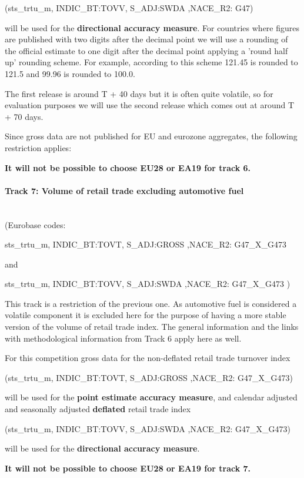 \documentclass[12pt]{article}
\begin{document}
(sts\_trtu\_m, INDIC\_BT:TOVV, S\_ADJ:SWDA ,NACE\_R2: G47)

 will be used for the \textbf{directional accuracy measure}. For countries where figures are published with two digits after the decimal point we will use a rounding of the official estimate to one digit after the decimal point applying a 'round half up' rounding scheme. For example, according to this scheme 121.45 is rounded to 121.5 and 99.96 is rounded to 100.0.

The first release is around T + 40 days but it is often quite volatile, so for evaluation purposes we will use the second release which comes out at around T + 70 days.

Since gross data are not published for EU and eurozone aggregates, the following restriction applies:

\textbf{It will not be possible to choose EU28 or EA19 for track 6.}


\paragraph{Track 7: Volume of retail trade excluding automotive fuel}
\textbf{ }\\
(Eurobase codes:

 sts\_trtu\_m, INDIC\_BT:TOVT, S\_ADJ:GROSS ,NACE\_R2: G47\_X\_G473

and

sts\_trtu\_m, INDIC\_BT:TOVV, S\_ADJ:SWDA ,NACE\_R2: G47\_X\_G473
)

This track is a restriction of the previous one. As automotive fuel is considered a volatile component it is excluded here for the purpose of having a more stable version of the volume of retail trade index. The general information and the links with methodological information from Track 6 apply here as well. 


For this competition gross data for the non-deflated retail trade turnover index 

(sts\_trtu\_m, INDIC\_BT:TOVT, S\_ADJ:GROSS ,NACE\_R2: G47\_X\_G473) 

will be used for the \textbf{point estimate accuracy measure}, and calendar adjusted and seasonally adjusted \textbf{deflated} retail trade index  

(sts\_trtu\_m, INDIC\_BT:TOVV, S\_ADJ:SWDA ,NACE\_R2: G47\_X\_G473)

 will be used for the \textbf{directional accuracy measure}.

\textbf{It will not be possible to choose EU28 or EA19 for track 7.}
\end{document}
